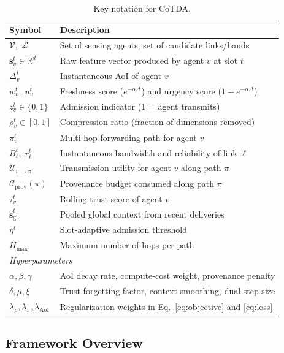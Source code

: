 \documentclass[final,3p,times,review,sort&compress]{elsarticle}
\begin{document}
\begin{table}[t]
\centering
\caption{Key notation for CoTDA.}
\label{tab:notation}
\begin{tabularx}{\columnwidth}{lX}
\toprule
\textbf{Symbol} & \textbf{Description} \\
\midrule
$\mathcal{V},\;\mathcal{L}$ & Set of sensing agents; set of candidate links/bands \\
$\mathbf{s}_v^t\in\mathbb{R}^d$ & Raw feature vector produced by agent $v$ at slot $t$ \\
$\Delta_v^t$ & Instantaneous AoI of agent $v$ \\
$w_v^t,\;u_v^t$ & Freshness score ($e^{-\alpha\Delta}$) and urgency score ($1-e^{-\alpha\Delta}$) \\
$z_v^t\in\{0,1\}$ & Admission indicator (1 = agent transmits) \\
$\rho_v^t\in[0,1]$ & Compression ratio (fraction of dimensions removed) \\
$\pi_v^t$ & Multi-hop forwarding path for agent $v$ \\
$B_\ell^t,\;r_\ell^t$ & Instantaneous bandwidth and reliability of link $\ell$ \\
$\mathcal{U}_{v\to\pi}$ & Transmission utility for agent $v$ along path $\pi$ \\
$\mathcal{C}_{\mathrm{prov}}(\pi)$ & Provenance budget consumed along path $\pi$ \\
$\tau_v^t$ & Rolling trust score of agent $v$ \\
$\hat{\mathbf{s}}_{\mathrm{gl}}^t$ & Pooled global context from recent deliveries \\
$\eta^t$ & Slot-adaptive admission threshold \\
$H_{\max}$ & Maximum number of hops per path \\
\midrule
\multicolumn{2}{l}{\textit{Hyperparameters}} \\
$\alpha,\beta,\gamma$ & AoI decay rate, compute-cost weight, provenance penalty \\
$\delta,\mu,\xi$ & Trust forgetting factor, context smoothing, dual step size \\
$\lambda_\rho,\lambda_\pi,\lambda_{\mathrm{AoI}}$ & Regularization weights in Eq.~\eqref{eq:objective} and \eqref{eq:loss} \\
\bottomrule
\end{tabularx}
\end{table}

\subsection{Framework Overview}
\label{subsec:overview}
\end{document}
